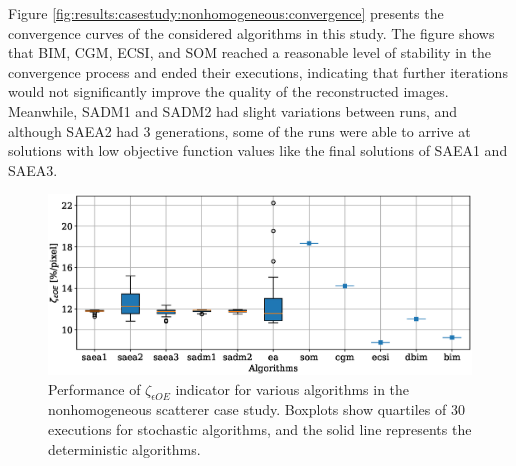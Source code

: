 			
			Figure \ref{fig:results:casestudy:nonhomogeneous:convergence} presents the convergence curves of the considered algorithms in this study. The figure shows that BIM, CGM, ECSI, and SOM reached a reasonable level of stability in the convergence process and ended their executions, indicating that further iterations would not significantly improve the quality of the reconstructed images. Meanwhile, SADM1 and SADM2 had slight variations between runs, and although SAEA2 had 3 generations, some of the runs were able to arrive at solutions with low objective function values like the final solutions of SAEA1 and SAEA3.
		
			\begin{figure}
				\centering
				\includegraphics[width=.9\textwidth]{./figuras/casestudy/nonhomogeneous/boxplot_zeta_eoe}
				\caption[Performance of $\zeta_{\epsilon OE}$ indicator for various algorithms in the nonhomogeneous scatterer case study.]{Performance of $\zeta_{\epsilon OE}$ indicator for various algorithms in the nonhomogeneous scatterer case study. Boxplots show quartiles of 30 executions for stochastic algorithms, and the solid line represents the deterministic algorithms.}
				\label{fig:results:casestudy:nonhomogeneous:boxplot:zeta_eoe}
			\end{figure}
		
			
